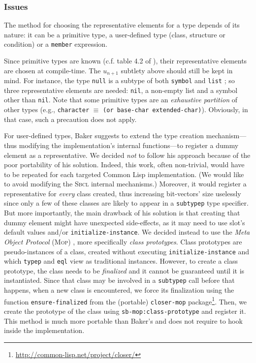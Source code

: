 \documentclass[format=sigconf]{acmart}
\newcommand\code[2][\small]{\sloppy\texttt{#1#2}}
\theoremstyle{definition}
\newcommand\sbcl{\textsc{Sbcl}}
\begin{document}
\subsubsection{Issues}
\label{sec:issues}
The method for choosing the representative elements for a type depends of its
nature: it can be a primitive type, a user-defined type (class, structure or
condition) or a \code{member} expression.

Since primitive types are known (c.f. table 4.2 of
\cite{bib:ansi.94.cl.type-specifiers}), their representative elements are chosen
at compile-time.
The $u_{n+1}$ subtlety above should still be kept in mind. For
instance, the type \code{null} is a subtype of both \code{symbol} and
\code{list} ; so three representative elements are needed: \code{nil}, a non-empty
list and a symbol other than \code{nil}. Note that some primitive types are an
\emph{exhaustive partition} of other types (e.g., \code{character} $\equiv$
\code{(or base-char extended-char)}).
Obviously, in that case, such a precaution does not apply.

For user-defined types, Baker suggests to extend the type creation
mechanism---thus modifying the implementation's internal functions---to
register a dummy element as a representative. We decided \emph{not} to follow
his approach because of the poor portability of his solution. Indeed, this
work, often non-trivial, would have to be repeated for each targeted Common Lisp
implementation. (We would like to avoid modifying the \sbcl{} internal
mechanisms.)
Moreover, it would register a representative for \emph{every}
class created, thus increasing bit-vectors' size uselessly since only a few of
these classes are likely to appear in a \code{subtypep} type specifier.
But more importantly, the main drawback of his solution is that creating that
dummy element might have unexpected side-effects, as it may need to use slot's
default values and/or \code{initialize-instance}.
We decided instead to use the \emph{Meta Object Protocol} (\textsc{Mop})
\cite{bib:kiczales.91.book}, more specifically \emph{class prototypes}. Class
prototypes are pseudo-instances of a class, created without executing
\code{initialize-instance} and which \code{typep} and \code{eql} view as
traditional instances. However, to create a class prototype, the class needs to
be \emph{finalized} and it cannot be guaranteed until it is instantiated.
Since that class may be involved in a \code{subtypep} call before that happens,
when a new class is encountered, we force its finalization using the function
\code{ensure-finalized} from the (portable) \code{closer-mop} package\footnote{
  \url{http://common-lisp.net/project/closer/}
}.
Then, we create the prototype of the class using \code{sb-mop:class-prototype}
and register it. This method is much more portable than Baker's and does not
require to hook inside the implementation.
\end{document}
